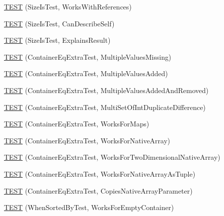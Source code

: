 \begin{DoxyCompactItemize}
\item 
\mbox{\hyperlink{namespacetesting_1_1gmock__matchers__test_a53bcd375786f69d889a8e8891ff8e0b0}{T\+E\+ST}} (Size\+Is\+Test, Works\+With\+References)
\item 
\mbox{\hyperlink{namespacetesting_1_1gmock__matchers__test_adc9720306de1626aa7e523637ca64dfa}{T\+E\+ST}} (Size\+Is\+Test, Can\+Describe\+Self)
\item 
\mbox{\hyperlink{namespacetesting_1_1gmock__matchers__test_a6c218845fd345302c490ef53f0d36995}{T\+E\+ST}} (Size\+Is\+Test, Explains\+Result)
\item 
\mbox{\hyperlink{namespacetesting_1_1gmock__matchers__test_ab84ac6cfde20f21ed69d5d7aa882ea1b}{T\+E\+ST}} (Container\+Eq\+Extra\+Test, Multiple\+Values\+Missing)
\item 
\mbox{\hyperlink{namespacetesting_1_1gmock__matchers__test_acc28beb0f3d3fbd8923bad7eb08ce6a6}{T\+E\+ST}} (Container\+Eq\+Extra\+Test, Multiple\+Values\+Added)
\item 
\mbox{\hyperlink{namespacetesting_1_1gmock__matchers__test_acb0d845f828c2d5a551e4db0611f2853}{T\+E\+ST}} (Container\+Eq\+Extra\+Test, Multiple\+Values\+Added\+And\+Removed)
\item 
\mbox{\hyperlink{namespacetesting_1_1gmock__matchers__test_a6bce9564bb713ffb690b776e35d2e6cf}{T\+E\+ST}} (Container\+Eq\+Extra\+Test, Multi\+Set\+Of\+Int\+Duplicate\+Difference)
\item 
\mbox{\hyperlink{namespacetesting_1_1gmock__matchers__test_ab7bcbeeeb23094cff6f2882304c05134}{T\+E\+ST}} (Container\+Eq\+Extra\+Test, Works\+For\+Maps)
\item 
\mbox{\hyperlink{namespacetesting_1_1gmock__matchers__test_ae5e5420340c8cf91d24af11feca669b0}{T\+E\+ST}} (Container\+Eq\+Extra\+Test, Works\+For\+Native\+Array)
\item 
\mbox{\hyperlink{namespacetesting_1_1gmock__matchers__test_a3cf0d2f2c08e34ca0b7e11ff27b4a7ca}{T\+E\+ST}} (Container\+Eq\+Extra\+Test, Works\+For\+Two\+Dimensional\+Native\+Array)
\item 
\mbox{\hyperlink{namespacetesting_1_1gmock__matchers__test_a94e4a2a02cde84ac51e37cda1813bc77}{T\+E\+ST}} (Container\+Eq\+Extra\+Test, Works\+For\+Native\+Array\+As\+Tuple)
\item 
\mbox{\hyperlink{namespacetesting_1_1gmock__matchers__test_af7a978384d567d133240fb1899ec1658}{T\+E\+ST}} (Container\+Eq\+Extra\+Test, Copies\+Native\+Array\+Parameter)
\item 
\mbox{\hyperlink{namespacetesting_1_1gmock__matchers__test_a9d88fbc6e2d01b66a1c10b192b25a802}{T\+E\+ST}} (When\+Sorted\+By\+Test, Works\+For\+Empty\+Container)

\end{DoxyCompactItemize}
